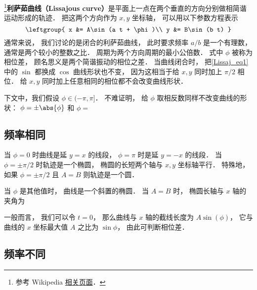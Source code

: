 
\begin{issues}
\issueDraft
\end{issues}


\footnote{参考 Wikipedia \href{https://en.wikipedia.org/wiki/Lissajous_curve}{相关页面}．}\textbf{利萨茹曲线（Lissajous curve）}是平面上一点在两个垂直的方向分别做相简谐运动形成的轨迹． 把这两个方向作为 $x, y$ 坐标轴， 可以用以下参数方程表示
\begin{equation}\label{Lissaj_eq1}
\leftgroup{
x &= A\sin(a t + \phi)\\
y &= B\sin(b t)
}\end{equation}
通常来说， 我们讨论的是闭合的利萨茹曲线， 此时要求频率 $a/b$ 是一个有理数， 通常是两个较小的整数之比． 周期为两个方向周期的最小公倍数． 式中 $\phi$ 被称为相位差， 顾名思义是两个简谐振动的相位之差． 当曲线闭合时， 把\autoref{Lissaj_eq1} 中的 $\sin$ 都换成 $\cos$ 曲线形状也不变， 因为这相当于给 $x, y$ 同时加上 $\pi/2$ 相位． 给 $x, y$ 同时加上任意相同的相位都不会改变曲线形状．

下文中，我们假设 $\phi \in (-\pi, \pi]$． 不难证明， 给 $\phi$ 取相反数同样不改变曲线的形状： $\phi = \pm\abs{\phi}$ 和 $\phi = $

\subsection{频率相同}
当 $\phi = 0$ 时曲线是延 $y=x$ 的线段， $\phi = \pi$ 时是延 $y=-x$ 的线段． 当 $\phi = \pm\pi/2$ 时轨迹是一个椭圆， 椭圆的长短两个轴与 $x,y$ 坐标轴平行． 特殊地， 如果 $\phi = \pm\pi/2$ 且 $A = B$ 则轨迹是一个圆．



当 $\phi$ 是其他值时， 曲线是一个斜置的椭圆． 当 $A = B$ 时， 椭圆长轴与 $x$ 轴的夹角为

一般而言， 我们可以令 $t = 0$， 那么曲线与 $x$ 轴的截线长度为 $A\sin(\phi)$， 它与曲线的 $x$ 坐标最大值 $A$ 之比为 $\sin\phi$， 由此可判断相位差．

\subsection{频率不同}
